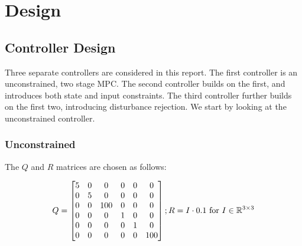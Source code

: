 \documentclass[conference, tikz]{IEEEtran}
\begin{document}
\section{Design}
\subsection{Controller Design}
Three separate controllers are considered in this report. 
The first controller is an unconstrained, two stage MPC. The second controller builds on the first, and introduces both state and input constraints. The third controller further builds on the first two, introducing disturbance rejection.
We start by looking at the unconstrained controller.
\subsubsection{Unconstrained}
The $Q$ and $R$ matrices are chosen as follows:

\[
    Q = \begin{bmatrix}
        5&0&0&0&0&0 \\
        0&5&0&0&0&0 \\
        0&0&100&0&0&0 \\
        0&0&0&1&0&0 \\
        0&0&0&0&1&0 \\
        0&0&0&0&0&100 \\
    \end{bmatrix}
    ;\\ R = I \cdot 0.1 \text{ for }  I \in \mathbb{R}^{3\times 3}
\]
\end{document}
